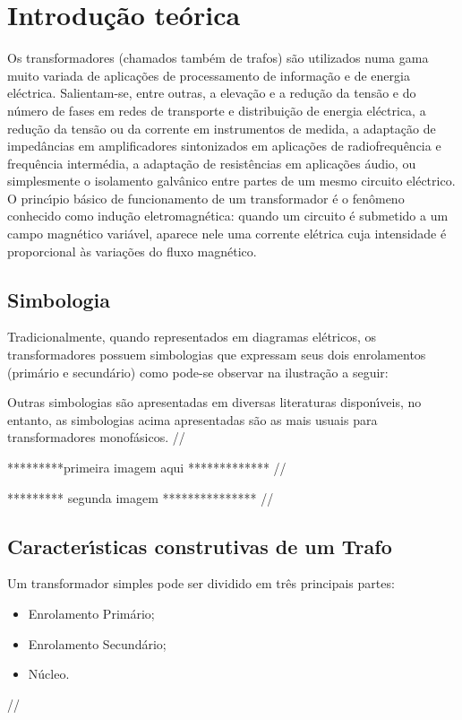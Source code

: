 \chapter{Introdu\c{c}\~{a}o te\'{o}rica}
Os transformadores (chamados tamb\'{e}m de trafos) s\~{a}o utilizados numa gama muito variada de aplica\c{c}\~{o}es de processamento de informa\c{c}\~{a}o e de energia el\'{e}ctrica. Salientam-se, entre outras, a eleva\c{c}\~{a}o e a redu\c{c}\~{a}o da tens\~{a}o e do n\'{u}mero de fases em redes de transporte e distribui\c{c}\~{a}o de energia el\'{e}ctrica, a redu\c{c}\~{a}o da tens\~{a}o ou da corrente em instrumentos de medida, a adapta\c{c}\~{a}o de imped\^{a}ncias em amplificadores sintonizados em aplica\c{c}\~{o}es de radiofrequ\^{e}ncia e frequ\^{e}ncia interm\'{e}dia, a adapta\c{c}\~{a}o de resist\^{e}ncias em aplica\c{c}\~{o}es \'{a}udio, ou simplesmente o isolamento galv\^{a}nico entre partes de um mesmo circuito el\'{e}ctrico.
O princ\'{\i}pio b\'{a}sico de funcionamento de um transformador \'{e} o fen\^{o}meno conhecido como indu\c{c}\~{a}o eletromagn\'{e}tica: quando um circuito \'{e} submetido a um campo magn\'{e}tico vari\'{a}vel, aparece nele uma corrente el\'{e}trica cuja intensidade \'{e} proporcional \`{a}s varia\c{c}\~{o}es do fluxo magn\'{e}tico.

\section{Simbologia}
Tradicionalmente, quando representados em diagramas el\'{e}tricos, os transformadores possuem simbologias que expressam seus dois enrolamentos (prim\'{a}rio e secund\'{a}rio) como pode-se observar na ilustra\c{c}\~{a}o a seguir:

Outras simbologias s\~{a}o apresentadas em diversas literaturas dispon\'{\i}veis, no entanto, as simbologias acima apresentadas s\~{a}o as mais usuais para transformadores monof\'{a}sicos. //

*********primeira imagem aqui ************* //

********* segunda imagem *************** //

\section{Caracter\'{\i}sticas construtivas de um Trafo}

Um transformador simples pode ser dividido em tr\^{e}s principais partes:
\begin{itemize}
  \item Enrolamento Prim\'{a}rio;
  \item Enrolamento Secund\'{a}rio;
  \item N\'{u}cleo.
\end{itemize} //

